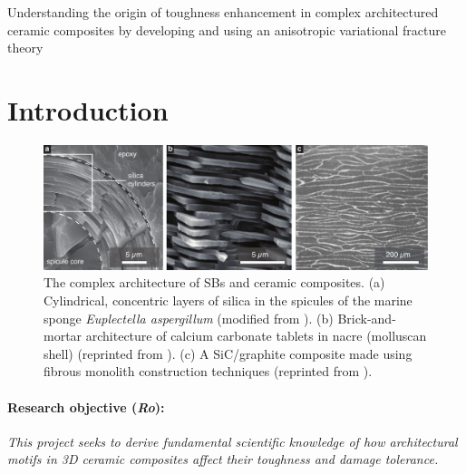 \documentclass[10pt,letterpaper]{article}
\begin{document}
\setcounter{page}{1}

\begin{center}
  \fontsize{12}{2em}
  \selectfont
  Understanding the origin of toughness enhancement in complex architectured ceramic composites by developing and using an anisotropic variational fracture theory
\end{center}

\section{Introduction}
  \label{s:Intro}

    \begin{figure}[b!]
      \centering
        \includegraphics[width=\textwidth, trim={0 0.0cm 0.0cm 0}, clip]{Figures/Introduction/IntroFig_V6.pdf}
        \caption{ \footnotesize The complex architecture of SBs and ceramic composites. (a) Cylindrical, concentric layers of silica in the spicules of the marine sponge \textit{Euplectella aspergillum} (modified from \cite{monn2015new}). (b) Brick-and-mortar architecture of calcium carbonate tablets in nacre (molluscan shell) (reprinted from \cite{ritchie2011conflicts}). (c) A SiC/graphite composite made using fibrous monolith construction techniques (reprinted from \cite{baskaran1993fibrous}).
          }
        \label{f:intro}
    \end{figure}


  \paragraph{Research objective (\emph{Ro}):} \emph{This project seeks to derive fundamental scientific  knowledge of  how architectural motifs in 3D ceramic composites affect their toughness and damage tolerance.}
\end{document}
